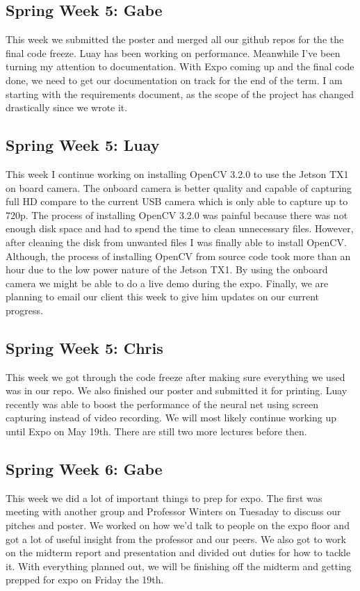 \documentclass[onecolumn, draftclsnofoot,10pt, compsoc]{IEEEtran}
\begin{document}
\subsection{Spring Week 5: Gabe}
This week we submitted the poster and merged all our github repos for the the final code freeze. Luay has been working on performance. Meanwhile I've been turning my attention to documentation. With Expo coming up and the final code done, we need to get our documentation on track for the end of the term. I am starting with the requirements document, as the scope of the project has changed drastically since we wrote it.
\subsection{Spring Week 5: Luay}
This week I continue working on installing OpenCV 3.2.0 to use the Jetson TX1 on board camera. The onboard camera is better quality and capable of capturing full HD compare to the current USB camera which is only able to capture up to 720p. The process of installing OpenCV 3.2.0 was painful because there was not enough disk space and had to spend the time to clean unnecessary files. However, after cleaning the disk from unwanted files I was finally able to install OpenCV. Although, the process of installing OpenCV from source code took more than an hour due to the low power nature of the Jetson TX1. By using the onboard camera we might be able to do a live demo during the expo. Finally, we are planning to email our client this week to give him updates on our current progress.
\subsection{Spring Week 5: Chris}
This week we got through the code freeze after making sure everything we used was in our repo. We also finished our poster and submitted it for printing. Luay recently was able to boost the performance of the neural net using screen capturing instead of video recording. We will most likely continue working up until Expo on May 19th. There are still two more lectures before then.
\subsection{Spring Week 6: Gabe}
This week we did a lot of important things to prep for expo. The first was meeting with another group and Professor Winters on Tuesaday to discuss our pitches and poster. We worked on how we'd talk to people on the expo floor and got a lot of useful insight from the professor and our peers. We also got to work on the midterm report and presentation and divided out duties for how to tackle it. With everything planned out, we will be finishing off the midterm and getting prepped for expo on Friday the 19th.
\end{document}
